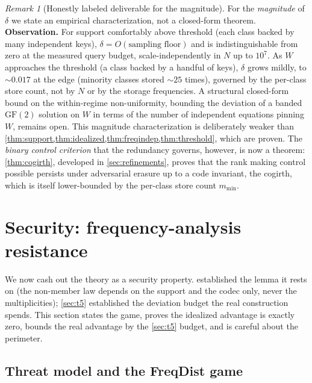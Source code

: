 \documentclass[11pt]{article}
\theoremstyle{definition}
\theoremstyle{plain}
\theoremstyle{remark}
\newtheorem{remark}{Remark}[section]
\newcommand{\GF}{\mathrm{GF}(2)}
\newcommand{\W}{W}                          %
\begin{document}
\begin{remark}[Honestly labeled deliverable for the magnitude]
\label{rem:t5-bound}
For the \emph{magnitude} of $\delta$ we state an empirical characterization, not a
closed-form theorem. \textbf{Observation.} For support comfortably above threshold (each
class backed by many independent keys), $\delta = O(\text{sampling floor})$ and is
indistinguishable from zero at the measured query budget, scale-independently in $N$ up to
$10^7$. As $\W$ approaches the threshold (a class backed by a handful of keys), $\delta$
grows mildly, to $\sim 0.017$ at the edge (minority classes stored $\sim 25$ times),
governed by the per-class store count, not by $N$ or by the storage frequencies. A
structural closed-form bound on the within-regime non-uniformity, bounding the deviation of
a banded $\GF$ solution on $\W$ in terms of the number of independent equations pinning
$\W$, remains open. This magnitude characterization is deliberately weaker than
\cref{thm:support,thm:idealized,thm:freqindep,thm:threshold}, which are proven. The
\emph{binary control criterion} that the redundancy governs, however, is now a theorem:
\cref{thm:cogirth}, developed in \cref{sec:refinements}, proves that the rank making control possible persists under
adversarial erasure up to a code invariant, the cogirth, which is itself lower-bounded by
the per-class store count $m_{\min}$.
\end{remark}

\section{Security: frequency-analysis resistance}
\label{sec:security}

We now cash out the theory as a security property.  established the
lemma it rests on (the non-member law depends on the support and the codec only, never
the multiplicities); \cref{sec:t5} established the deviation budget the real construction
spends. This section states the game, proves the idealized advantage is exactly zero,
bounds the real advantage by the \cref{sec:t5} budget, and is careful about the
perimeter.

\subsection{Threat model and the FreqDist game}
\end{document}
